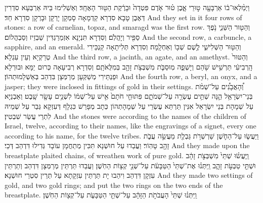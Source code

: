 {וַיְמַ֨לְאוּ־ב֔וֹ אַרְבָּעָ֖ה ט֣וּרֵי אָ֑בֶן ט֗וּר אֹ֤דֶם פִּטְדָה֙ וּבָרֶ֔קֶת הַטּ֖וּר הָאֶחָֽד׃}
{וְאַשְׁלִימוּ בֵּיהּ אַרְבְּעָא סִדְרִין דְּאֶבֶן טָבָא סִדְרָא קַדְמָאָה סָמְקָן יָרְקָן וּבָרְקָן סִדְרָא חַד׃}
{And they set in it four rows of stones: a row of carnelian, topaz, and smaragd was the first row.}{}
{וְהַטּ֖וּר הַשֵּׁנִ֑י נֹ֥פֶךְ סַפִּ֖יר וְיָהֲלֹֽם׃}
{וְסִדְרָא תִּנְיָנָא אִזְמַרַגְדִּין שַׁבְזֵיז וְסַבְהֲלוֹם׃}
{And the second row, a carbuncle, a sapphire, and an emerald.}{}
{וְהַטּ֖וּר הַשְּׁלִישִׁ֑י לֶ֥שֶׁם שְׁב֖וֹ וְאַחְלָֽמָה׃}
{וְסִדְרָא תְּלִיתָאָה קַנְכֵּירִי טְרַקְיָא וְעֵין עִגְלָא׃}
{And the third row, a jacinth, an agate, and an amethyst.}{}
{וְהַטּוּר֙ הָֽרְבִיעִ֔י תַּרְשִׁ֥ישׁ שֹׁ֖הַם וְיָשְׁפֵ֑ה מֽוּסַבֹּ֛ת מִשְׁבְּצֹ֥ת זָהָ֖ב בְּמִלֻּאֹתָֽם׃}
{וְסִדְרָא רְבִיעָאָה כְּרוּם יַמָּא וּבוּרְלָא וּפַנְתֵּירִי מְשַׁקְּעָן מְרַמְּצָן בִּדְהַב בְּאַשְׁלָמוּתְהוֹן׃}
{And the fourth row, a beryl, an onyx, and a jasper; they were inclosed in fittings of gold in their settings.}{}
{וְ֠הָאֲבָנִ֠ים עַל־שְׁמֹ֨ת בְּנֵי־יִשְׂרָאֵ֥ל הֵ֛נָּה שְׁתֵּ֥ים עֶשְׂרֵ֖ה עַל־שְׁמֹתָ֑ם פִּתּוּחֵ֤י חֹתָם֙ אִ֣ישׁ עַל־שְׁמ֔וֹ לִשְׁנֵ֥ים עָשָׂ֖ר שָֽׁבֶט׃}
{וְאַבְנַיָּא עַל שְׁמָהָת בְּנֵי יִשְׂרָאֵל אִנִּין תַּרְתַּא עֶשְׂרֵי עַל שְׁמָהָתְהוֹן כְּתָב מְפָרַשׁ כִּגְלָף דְּעִזְקָא גְּבַר עַל שְׁמֵיהּ לִתְרֵי עֲשַׂר שִׁבְטִין׃}
{And the stones were according to the names of the children of Israel, twelve, according to their names, like the engravings of a signet, every one according to his name, for the twelve tribes.}{}
{וַיַּעֲשׂ֧וּ עַל־הַחֹ֛שֶׁן שַׁרְשְׁרֹ֥ת גַּבְלֻ֖ת מַעֲשֵׂ֣ה עֲבֹ֑ת זָהָ֖ב טָהֽוֹר׃}
{וַעֲבַדוּ עַל חוּשְׁנָא תִּכִּין מְתַחֲמָן עוֹבָד גְּדִילוּ דִּדְהַב דְּכֵי׃}
{And they made upon the breastplate plaited chains, of wreathen work of pure gold.}{}
{וַֽיַּעֲשׂ֗וּ שְׁתֵּי֙ מִשְׁבְּצֹ֣ת זָהָ֔ב וּשְׁתֵּ֖י טַבְּעֹ֣ת זָהָ֑ב וַֽיִּתְּנ֗וּ אֶת־שְׁתֵּי֙ הַטַּבָּעֹ֔ת עַל־שְׁנֵ֖י קְצ֥וֹת הַחֹֽשֶׁן׃}
{וַעֲבַדוּ תַּרְתֵּין מְרַמְּצָן דִּדְהַב וְתַרְתֵּין עִזְקָן דִּדְהַב וִיהַבוּ יָת תַּרְתֵּין עִזְקָתָא עַל תְּרֵין סִטְרֵי חוּשְׁנָא׃}
{And they made two settings of gold, and two gold rings; and put the two rings on the two ends of the breastplate.}{}
{וַֽיִּתְּנ֗וּ שְׁתֵּי֙ הָעֲבֹתֹ֣ת הַזָּהָ֔ב עַל־שְׁתֵּ֖י הַטַּבָּעֹ֑ת עַל־קְצ֖וֹת הַחֹֽשֶׁן׃}
